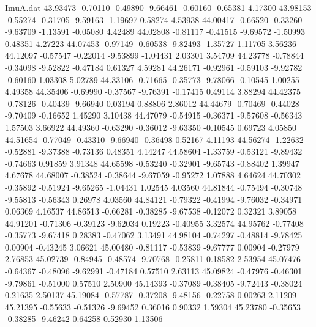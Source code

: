 \begin{filecontents}{ImuA.dat}
  43.93473   -0.70110   -0.49890   -9.66461   -0.60160   -0.65381    4.17300
  43.98153   -0.55274   -0.31705   -9.59163   -1.19697    0.58274    4.53938
  44.00417   -0.66520   -0.33260   -9.63709   -1.13591   -0.05080    4.42489
  44.02808   -0.81117   -0.41515   -9.69572   -1.50993    0.48351    4.27223
  44.07453   -0.97149   -0.60538   -9.82493   -1.35727    1.11705    3.56236
  44.12097   -0.57547   -0.22014   -9.53899   -1.04431    2.03301    3.54709
  44.23778   -0.78844   -0.34098   -9.52822   -0.47184    0.61327    4.59281
  44.26171   -0.92961   -0.59103   -9.92782   -0.60160    1.03308    5.02789
  44.33106   -0.71665   -0.35773   -9.78066   -0.10545    1.00255    4.49358
  44.35406   -0.69990   -0.37567   -9.76391   -0.17415    0.49114    3.88294
  44.42375   -0.78126   -0.40439   -9.66940    0.03194    0.88806    2.86012
  44.44679   -0.70469   -0.44028   -9.70409   -0.16652    1.45290    3.10438
  44.47079   -0.54915   -0.36371   -9.57608   -0.56343    1.57503    3.66922
  44.49360   -0.63290   -0.36012   -9.63350   -0.10545    0.69723    4.05850
  44.51654   -0.77049   -0.43310   -9.66940   -0.36498    0.52167    4.11193
  44.56274   -1.22632   -0.52881   -9.37388   -0.73136    0.48351    4.14247
  44.58604   -1.33759   -0.53121   -9.89432   -0.74663    0.91859    3.91348
  44.65598   -0.53240   -0.32901   -9.65743   -0.88402    1.39947    4.67678
  44.68007   -0.38524   -0.38644   -9.67059   -0.95272    1.07888    4.64624
  44.70302   -0.35892   -0.51924   -9.65265   -1.04431    1.02545    4.03560
  44.81844   -0.75494   -0.30748   -9.55813   -0.56343    0.26978    4.03560
  44.84121   -0.79322   -0.41994   -9.76032   -0.34971    0.06369    4.16537
  44.86513   -0.66281   -0.38285   -9.67538   -0.12072    0.32321    3.89058
  44.91201   -0.71306   -0.39123   -9.62034    0.19223   -0.40955    3.32574
  44.95762   -0.77408   -0.35773   -9.67418    0.28383   -0.47062    3.13491
  44.98104   -0.74297   -0.48814   -9.78425    0.00904   -0.43245    3.06621
  45.00480   -0.81117   -0.53839   -9.67777    0.00904   -0.27979    2.76853
  45.02739   -0.84945   -0.48574   -9.70768   -0.25811    0.18582    2.53954
  45.07476   -0.64367   -0.48096   -9.62991   -0.47184    0.57510    2.63113
  45.09824   -0.47976   -0.46301   -9.79861   -0.51000    0.57510    2.50900
  45.14393   -0.37089   -0.38405   -9.72443   -0.38024    0.21635    2.50137
  45.19084   -0.57787   -0.37208   -9.48156   -0.22758    0.00263    2.11209
  45.21395   -0.55633   -0.51326   -9.69452    0.36016    0.90332    1.59304
  45.23780   -0.35653   -0.38285   -9.46242    0.64258    0.52930    1.13506

\end{filecontents}
